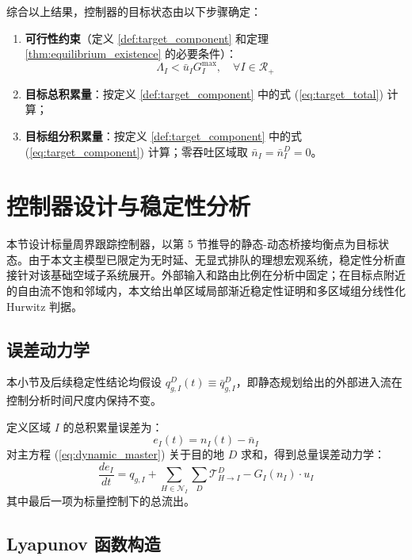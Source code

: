 \documentclass[a4paper,12pt]{article}
\theoremstyle{plain}
\theoremstyle{definition}
\theoremstyle{remark}
\begin{document}
综合以上结果，控制器的目标状态由以下步骤确定：
\begin{enumerate}
    \item \textbf{可行性约束}（定义 \ref{def:target_component} 和定理 \ref{thm:equilibrium_existence} 的必要条件）：
    \begin{equation} \label{eq:feasibility}
        \Lambda_I < \bar u_I G_I^{\max}, \quad \forall I \in \mathcal{R}_+
    \end{equation}
    \item \textbf{目标总积累量}：按定义 \ref{def:target_component} 中的式 (\ref{eq:target_total}) 计算；
    \item \textbf{目标组分积累量}：按定义 \ref{def:target_component} 中的式 (\ref{eq:target_component}) 计算；零吞吐区域取 $\bar n_I=\bar n_I^D=0$。
\end{enumerate}

\section{控制器设计与稳定性分析}

本节设计标量周界跟踪控制器，以第 5 节推导的静态-动态桥接均衡点为目标状态。由于本文主模型已限定为无时延、无显式排队的理想宏观系统，稳定性分析直接针对该基础空域子系统展开。外部输入和路由比例在分析中固定；在目标点附近的自由流不饱和邻域内，本文给出单区域局部渐近稳定性证明和多区域组分线性化 Hurwitz 判据。

\subsection{误差动力学}

本小节及后续稳定性结论均假设 $q_{g,I}^D(t)\equiv\bar q_{g,I}^D$，即静态规划给出的外部进入流在控制分析时间尺度内保持不变。

定义区域 $I$ 的总积累量误差为：
\begin{equation}\label{eq:error_def}
    e_I(t) = n_I(t) - \bar{n}_I
\end{equation}
对主方程 (\ref{eq:dynamic_master}) 关于目的地 $D$ 求和，得到总量误差动力学：
\begin{equation}\label{eq:error_dynamics}
    \frac{de_I}{dt} = q_{g,I} + \sum_{H \in \mathcal{N}_I} \sum_D \mathcal{T}_{H \to I}^D - G_I(n_I) \cdot u_I
\end{equation}
其中最后一项为标量控制下的总流出。

\subsection{Lyapunov 函数构造}
\end{document}
